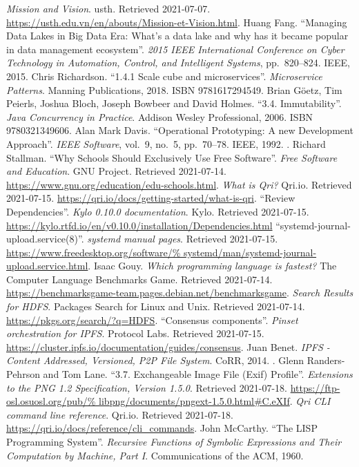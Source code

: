 \begin{thebibliography}{69}
   \emph{Mission and Vision}.
    \acrlong{usth}.  Retrieved 2021-07-07.
    \url{https://usth.edu.vn/en/abouts/Mission-et-Vision.html}.
   Huang Fang.
    ``Managing Data Lakes in Big Data Era: What's a data lake
    and why has it became popular in data management ecosystem''.
    \emph{2015 IEEE International Conference on Cyber Technology
    in Automation, Control, and Intelligent Systems}, pp.~820--824.
    IEEE, 2015.  
   Chris Richardson.
    ``1.4.1 Scale cube and microservices''.  \emph{Microservice Patterns}.
    Manning Publications, 2018.  ISBN 9781617294549.
   Brian Göetz, Tim Peierls, Joshua Bloch,
    Joseph Bowbeer and David Holmes.
    ``3.4. Immutability''.  \emph{Java Concurrency in Practice}.
    Addison Wesley Professional, 2006.  ISBN 9780321349606.
   Alan Mark Davis.
    ``Operational Prototyping: A new Development Approach''.
    \emph{IEEE Software}, vol.~9, no.~5, pp.~70--78.
    IEEE, 1992.  .
   Richard Stallman.
    ``Why Schools Should Exclusively Use Free Software''.
    \emph{Free Software and Education}.  GNU Project.  Retrieved 2021-07-14.
    \url{https://www.gnu.org/education/edu-schools.html}.
   \emph{What is Qri?} Qri.io.  Retrieved 2021-07-15.
    \url{https://qri.io/docs/getting-started/what-is-qri}.
   ``Review Dependencies''.  \emph{Kylo 0.10.0 documentation}.
    Kylo.  Retrieved 2021-07-15.
    \url{https://kylo.rtfd.io/en/v0.10.0/installation/Dependencies.html}
   ``systemd-journal-upload.service(8)''.
    \emph{systemd manual pages}.  Retrieved 2021-07-15.
    \url{https://www.freedesktop.org/software/%
         systemd/man/systemd-journal-upload.service.html}.
   Isaac Gouy.
    \emph{Which programming language is fastest?}
    The Computer Language Benchmarks Game.
    Retrieved 2021-07-14.
    \url{https://benchmarksgame-team.pages.debian.net/benchmarksgame}.
   \emph{Search Results for HDFS}.
    Packages Search for Linux and Unix.
    Retrieved 2021-07-14.  \url{https://pkgs.org/search/?q=HDFS}.
   ``Consensus components''.
    \emph{Pinset orchestration for IPFS}.
    Protocol Labs.  Retrieved 2021-07-15.
    \url{https://cluster.ipfs.io/documentation/guides/consensus}.
   Juan Benet.
    \emph{IPFS - Content Addressed, Versioned, P2P File System}.
    CoRR, 2014.  .
   Glenn Randers-Pehrson and Tom Lane.
    ``3.7. Exchangeable Image File (Exif) Profile''.
    \emph{Extensions to the PNG 1.2 Specification, Version 1.5.0}.
    Retrieved 2021-07-18.  \url{https://ftp-osl.osuosl.org/pub/%
    libpng/documents/pngext-1.5.0.html#C.eXIf}.
   \emph{Qri CLI command line reference}.  Qri.io.
    Retrieved 2021-07-18.  \url{https://qri.io/docs/reference/cli_commands}.
   John McCarthy.
    ``The LISP Programming System''.
    \emph{Recursive Functions of Symbolic Expressions
    and Their Computation by Machine, Part I}.
    Communications of the ACM, 1960.
\end{thebibliography}

